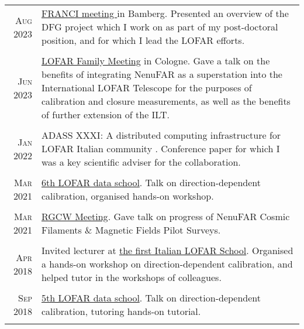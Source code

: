 \documentclass[11pt,a4paper,notitlepage]{article}
\begin{document}
\begin{tabular}{r|p{12.5cm}}
	
	
	

	\textsc{Aug 2023} & \href{https://indico.ecap.work/event/27/}{FRANCI meeting }in Bamberg. Presented an overview of the DFG project which I work on as part of my post-doctoral position, and for which I lead the LOFAR efforts.\\
	\multicolumn{2}{c}{} \\
	
	\textsc{Jun 2023} & \href{https://www.glowconsortium.de/index.php/en/lofar-family-meeting-2022}{LOFAR Family Meeting} in Cologne. Gave a talk on the benefits of integrating NenuFAR as a superstation into the International LOFAR Telescope for the purposes of calibration and closure measurements, as well as the benefits of further extension of the ILT.\\
	\multicolumn{2}{c}{} \\
		
	
	\textsc{Jan 2022} & ADASS XXXI: A distributed computing infrastructure for LOFAR Italian community \citep{2022arXiv220111526T}. Conference paper for which I was a key scientific adviser for the collaboration.\\
	\multicolumn{2}{c}{} \\
	
	\textsc{Mar 2021} & \href{https://www.astron.nl/lofarschool2021/}{6th LOFAR data school}. Talk on direction-dependent calibration, organised hands-on workshop.\\
	\multicolumn{2}{c}{} \\
	
	\textsc{Mar 2021} & \href{https://sites.google.com/inaf.it/rgcw-meeting/home-page}{RGCW Meeting}. Gave talk on progress of NenuFAR Cosmic Filaments \& Magnetic Fields Pilot Surveys.\\
	\multicolumn{2}{c}{} \\
	
	\textsc{Apr 2018} & Invited lecturer at \href{https://indico.ced.inaf.it/event/9/}{the first Italian LOFAR School}. Organised a hands-on workshop on direction-dependent calibration, and helped tutor in the workshops of colleagues.\\
	\multicolumn{2}{c}{} \\
	
	\textsc{Sep 2018} & \href{https://www.astron.nl/lofarschool2018/}{5th LOFAR data school}. Talk on direction-dependent calibration, tutoring hands-on tutorial.\\
	\multicolumn{2}{c}{} \\
	

\end{tabular}
\end{document}
